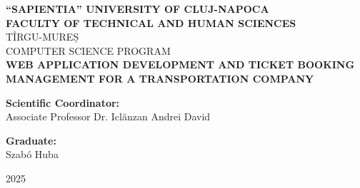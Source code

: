 \begin{titlepage}
    \centering
    \vspace*{2cm}

    {\Large \textbf{“SAPIENTIA” UNIVERSITY OF CLUJ-NAPOCA}}\\[0.2cm]
    {\Large \textbf{FACULTY OF TECHNICAL AND HUMAN SCIENCES}}\\[0.5cm]
    {\large TÎRGU-MUREȘ}\\[0.2cm]
    {\large  COMPUTER SCIENCE PROGRAM}\\[3cm]

    {\LARGE \textbf{WEB APPLICATION DEVELOPMENT AND TICKET BOOKING MANAGEMENT FOR A TRANSPORTATION COMPANY}}\\[4cm] 
    

    \noindent
\begin{minipage}[t]{0.48\textwidth}
    \raggedright
    \textbf{Scientific Coordinator:}\\[1em]
    Associate Professor Dr. Iclănzan Andrei David
\end{minipage}
\hfill
\begin{minipage}[t]{0.48\textwidth}
    \raggedleft
    \textbf{Graduate:}\\[1em]
    Szabó Huba
\end{minipage}


    \vfill

    {\large   2025}

\end{titlepage}
